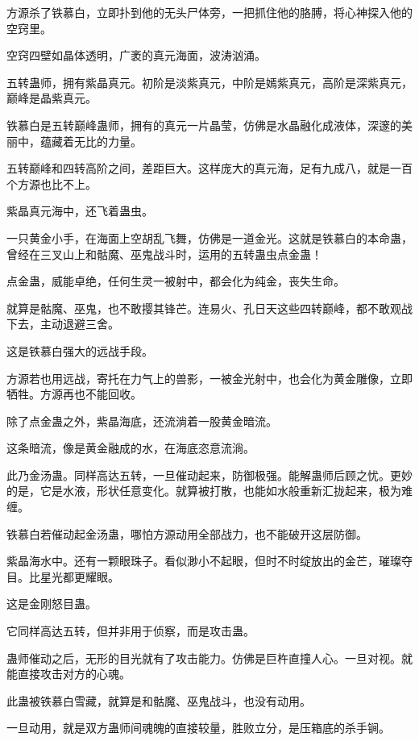 
\begin{this_body}



方源杀了铁慕白，立即扑到他的无头尸体旁，一把抓住他的胳膊，将心神探入他的空窍里。

空窍四壁如晶体透明，广袤的真元海面，波涛汹涌。

五转蛊师，拥有紫晶真元。初阶是淡紫真元，中阶是嫣紫真元，高阶是深紫真元，巅峰是晶紫真元。

铁慕白是五转巅峰蛊师，拥有的真元一片晶莹，仿佛是水晶融化成液体，深邃的美丽中，蕴藏着无比的力量。

五转巅峰和四转高阶之间，差距巨大。这样庞大的真元海，足有九成八，就是一百个方源也比不上。

紫晶真元海中，还飞着蛊虫。

一只黄金小手，在海面上空胡乱飞舞，仿佛是一道金光。这就是铁慕白的本命蛊，曾经在三叉山上和骷魔、巫鬼战斗时，运用的五转蛊虫点金蛊！

点金蛊，威能卓绝，任何生灵一被射中，都会化为纯金，丧失生命。

就算是骷魔、巫鬼，也不敢撄其锋芒。连易火、孔日天这些四转巅峰，都不敢观战下去，主动退避三舍。

这是铁慕白强大的远战手段。

方源若也用远战，寄托在力气上的兽影，一被金光射中，也会化为黄金雕像，立即牺牲。方源再也不能回收。

除了点金蛊之外，紫晶海底，还流淌着一股黄金暗流。

这条暗流，像是黄金融成的水，在海底恣意流淌。

此乃金汤蛊。同样高达五转，一旦催动起来，防御极强。能解蛊师后顾之忧。更妙的是，它是水液，形状任意变化。就算被打散，也能如水般重新汇拢起来，极为难缠。

铁慕白若催动起金汤蛊，哪怕方源动用全部战力，也不能破开这层防御。

紫晶海水中。还有一颗眼珠子。看似渺小不起眼，但时不时绽放出的金芒，璀璨夺目。比星光都更耀眼。

这是金刚怒目蛊。

它同样高达五转，但并非用于侦察，而是攻击蛊。

蛊师催动之后，无形的目光就有了攻击能力。仿佛是巨杵直撞人心。一旦对视。就能直接攻击对方的心魂。

此蛊被铁慕白雪藏，就算是和骷魔、巫鬼战斗，也没有动用。

一旦动用，就是双方蛊师间魂魄的直接较量，胜败立分，是压箱底的杀手锏。


\end{this_body}
